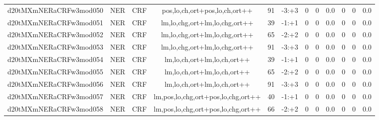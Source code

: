 \documentclass[a4paper]{article}
\begin{document}
\begin{landscape}
\begin{center}
\begin{tabular}{ |c|c|c|c|c|c|c|c|c|c|c|c|}
 
 	
 	\small{ d20tMXmNERaCRFw3mod050 } & \small{ NER} & \small{  CRF }  & pos,lo,ch,ort+pos,lo,ch,ort++  &  91 &  \small{  -3:+3 }  &  0 & 0 & 0.0  &  0 & 0 & 0.0 \\
 	

 
 	
 	\small{ d20tMXmNERaCRFw3mod051 } & \small{ NER} & \small{  CRF }  & lm,lo,chg,ort+lm,lo,chg,ort++  &  39 &  \small{  -1:+1 }  &  0 & 0 & 0.0  &  0 & 0 & 0.0 \\
 	

 
 	
 	\small{ d20tMXmNERaCRFw3mod052 } & \small{ NER} & \small{  CRF }  & lm,lo,chg,ort+lm,lo,chg,ort++  &  65 &  \small{  -2:+2 }  &  0 & 0 & 0.0  &  0 & 0 & 0.0 \\
 	

 
 	
 	\small{ d20tMXmNERaCRFw3mod053 } & \small{ NER} & \small{  CRF }  & lm,lo,chg,ort+lm,lo,chg,ort++  &  91 &  \small{  -3:+3 }  &  0 & 0 & 0.0  &  0 & 0 & 0.0 \\
 	

 
 	
 	\small{ d20tMXmNERaCRFw3mod054 } & \small{ NER} & \small{  CRF }  & lm,lo,ch,ort+lm,lo,ch,ort++  &  39 &  \small{  -1:+1 }  &  0 & 0 & 0.0  &  0 & 0 & 0.0 \\
 	

 
 	
 	\small{ d20tMXmNERaCRFw3mod055 } & \small{ NER} & \small{  CRF }  & lm,lo,ch,ort+lm,lo,ch,ort++  &  65 &  \small{  -2:+2 }  &  0 & 0 & 0.0  &  0 & 0 & 0.0 \\
 	

 
 	
 	\small{ d20tMXmNERaCRFw3mod056 } & \small{ NER} & \small{  CRF }  & lm,lo,ch,ort+lm,lo,ch,ort++  &  91 &  \small{  -3:+3 }  &  0 & 0 & 0.0  &  0 & 0 & 0.0 \\
 	

 
 	
 	\small{ d20tMXmNERaCRFw3mod057 } & \small{ NER} & \small{  CRF }  & lm,pos,lo,chg,ort+pos,lo,chg,ort++  &  40 &  \small{  -1:+1 }  &  0 & 0 & 0.0  &  0 & 0 & 0.0 \\
 	

 
 	
 	\small{ d20tMXmNERaCRFw3mod058 } & \small{ NER} & \small{  CRF }  & lm,pos,lo,chg,ort+pos,lo,chg,ort++  &  66 &  \small{  -2:+2 }  &  0 & 0 & 0.0  &  0 & 0 & 0.0 \\
 	


\end{tabular}
\end{center}
\end{landscape}
\end{document}
